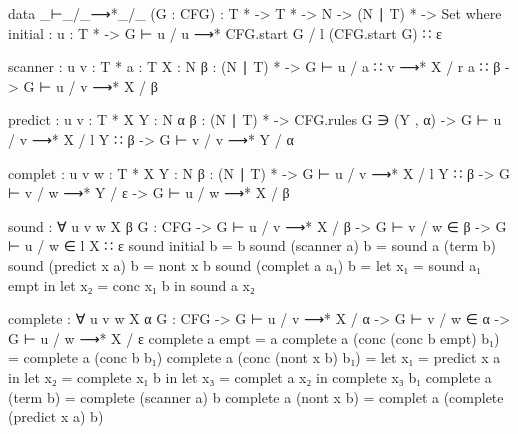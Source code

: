 	\begin{code}
		data _⊢_/_⟶*_/_ (G : CFG) : T * -> T * -> N -> (N ∣ T) * -> Set where
		  initial : {u : T *} ->
		    G ⊢ u / u ⟶* CFG.start G / l (CFG.start G) ∷ ε
		
		  scanner : {u v : T *} {a : T} {X : N} {β : (N ∣ T) *} ->
		    G ⊢ u / a ∷ v ⟶* X / r a ∷ β ->
		      G ⊢ u / v ⟶* X / β
		
		  predict : {u v : T *} {X Y : N} {α β : (N ∣ T) *} ->
		    CFG.rules G ∋ (Y , α) ->
		    G ⊢ u / v ⟶* X / l Y ∷ β ->
		      G ⊢ v / v ⟶* Y / α
		
		  complet : {u v w : T *} {X Y : N} {β : (N ∣ T) *} ->
		    G ⊢ u / v ⟶* X / l Y ∷ β ->
		    G ⊢ v / w ⟶* Y / ε ->
		      G ⊢ u / w ⟶* X / β
		
	\end{code}

	\begin{code}

		sound : ∀ {u v w X β} {G : CFG} ->
		  G ⊢ u / v ⟶* X / β ->
		  G ⊢ v / w ∈ β ->
		    G ⊢ u / w ∈ l X ∷ ε
		sound initial b = b
		sound (scanner a) b = sound a (term b)
		sound (predict x a) b = nont x b
		sound (complet a a₁) b =
		  let x₁ = sound a₁ empt in
		  let x₂ = conc x₁ b in
		  sound a x₂

	\end{code}

	\begin{code}
		
		complete : ∀ {u v w X α} {G : CFG} ->
		  G ⊢ u / v ⟶* X / α ->
		  G ⊢ v / w ∈ α ->
		    G ⊢ u / w ⟶* X / ε
		complete a empt = a
		complete a (conc (conc b empt) b₁) = complete a (conc b b₁)
		complete a (conc (nont x b) b₁) =
		  let x₁ = predict x a in
		  let x₂ = complete x₁ b in
		  let x₃ = complet a x₂ in
		  complete x₃ b₁
		complete a (term b) = complete (scanner a) b
		complete a (nont x b) = complet a (complete (predict x a) b)

	\end{code}
